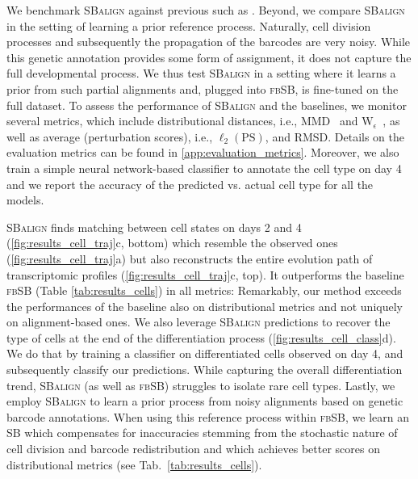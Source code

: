 We benchmark \textsc{SBalign} against previous  such as \citep[\textsc{fbSB}]{chen2021likelihood}. Beyond, we compare \textsc{SBalign} in the setting of learning a prior reference process. Naturally, cell division processes and subsequently the propagation of the barcodes are very noisy. While this genetic annotation provides some form of assignment, it does not capture the full developmental process. We thus test \textsc{SBalign} in a setting where it learns a prior from such partial alignments and, plugged into \textsc{fbSB}, is fine-tuned on the full dataset.
To assess the performance of \textsc{SBalign} and the baselines, we monitor several metrics, which include distributional distances, i.e., MMD~\citep{gretton2012kernel} and $\text{W}_{\epsilon}$~\citep{cuturi2013sinkhorn}, as well as average (perturbation scores), i.e., $\ell_2(\text{PS})$, and RMSD. Details on the evaluation metrics can be found in \cref{app:evaluation_metrics}.
Moreover, we also train a simple neural network-based classifier to annotate the cell type on day 4 and we report the accuracy of the predicted vs. actual cell type for all the models.


\textsc{SBalign} finds matching between cell states on days 2 and 4 (\cref{fig:results_cell_traj}c, bottom) which resemble the observed ones (\cref{fig:results_cell_traj}a) but also reconstructs the entire evolution path of transcriptomic profiles (\cref{fig:results_cell_traj}c, top).
It outperforms the baseline \textsc{fbSB} (Table \ref{tab:results_cells}) in all metrics: Remarkably, our method exceeds the performances of the baseline also on distributional metrics and not uniquely on alignment-based ones.
We also leverage \textsc{SBalign} predictions to recover the type of cells at the end of the differentiation process (\cref{fig:results_cell_class}d). We do that by training a classifier on differentiated cells observed on day 4, and subsequently classify our predictions. %
While capturing the overall differentiation trend, \textsc{SBalign} (as well as \textsc{fbSB}) struggles to isolate rare cell types.
Lastly, we employ \textsc{SBalign} to learn a prior process from noisy alignments based on genetic barcode annotations. When using this reference process within \textsc{fbSB}, we learn an SB which compensates for inaccuracies stemming from the stochastic nature of cell division and barcode redistribution and which achieves better scores on distributional metrics (see Tab.~\ref{tab:results_cells}).

